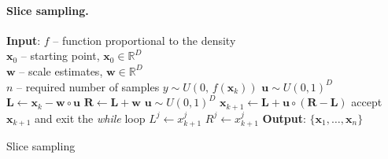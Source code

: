 \documentclass{itatnew}
\newcommand{\xx}{\mathrm{\mathbf{x}}}
\begin{document}
\paragraph{Slice sampling.}

\begin{algorithm}[b]
\begin{algorithmic}[1]
{\small
\STATE \textbf{Input}: $f$ -- function proportional to the density \\
  \quad $\xx_0$ -- starting point, $\xx_0 \in \mathbb{R}^D$ \\
  \quad $\mathbf{w}$ -- scale estimates, $\mathbf{w} \in \mathbb{R}^D$ \\
  \quad $n$ -- required number of samples
  \STATE $y \sim U(0, \, f(\xx_k))$  \hspace{\fill}  
  \STATE $\mathbf{u} \sim U(0,1)^D$ %
  \STATE $\mathbf{L} \leftarrow \xx_k - \mathbf{w} \circ \mathbf{u}$  \hspace{\fill}   %
  \STATE $\mathbf{R} \leftarrow \mathbf{L} + \mathbf{w}$   \hspace{\fill}  
    \STATE $\mathbf{u} \sim U(0,1)^D$
    \STATE $\xx_{k+1} \leftarrow \mathbf{L} + \mathbf{u} \circ (\mathbf{R} - \mathbf{L})$ \hspace{\fill}  \COMMENT{$\xx_{k+1} \sim U(\mathbf{L},\mathbf{R})$}
    \IF {$(y < f(\xx_{k+1}))$}
      \STATE accept $\xx_{k+1}$ and exit the \emph{while} loop
    \ENDIF
      \STATE $L^j \leftarrow x^j_{k+1}$  \hspace{\fill}  
      \ELSE
      \STATE $R^j \leftarrow x^j_{k+1}$  \hspace{\fill}  
      \ENDIF
    \ENDFOR
  \ENDWHILE
\ENDFOR
\STATE \textbf{Output}: $\{\xx_1,\ldots,\xx_n\}$
}
\end{algorithmic}
\caption{Slice sampling~\cite{neal_slice_2003}}
\label{alg:slice}
\end{algorithm}
\end{document}
